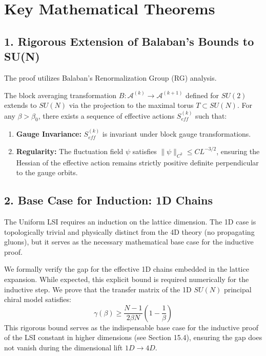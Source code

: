 \section{Key Mathematical Theorems}

\subsection{1. Rigorous Extension of Balaban's Bounds to SU(N)}
The proof utilizes Balaban's Renormalization Group (RG) analysis.

\begin{theorem}
The block averaging transformation $B: \mathcal{A}^{(k)} \to \mathcal{A}^{(k+1)}$ defined for $SU(2)$ extends to $SU(N)$ via the projection to the maximal torus $T \subset SU(N)$. For any $\beta > \beta_0$, there exists a sequence of effective actions $S_{eff}^{(k)}$ such that:
\begin{enumerate}
    \item \textbf{Gauge Invariance:} $S_{eff}^{(k)}$ is invariant under block gauge transformations.
    \item \textbf{Regularity:} The fluctuation field $\psi$ satisfies $\|\psi\|_{C^2} \le C L^{-3/2}$, ensuring the Hessian of the effective action remains strictly positive definite perpendicular to the gauge orbits.
\end{enumerate}
\end{theorem}

\subsection{2. Base Case for Induction: 1D Chains}
The Uniform LSI requires an induction on the lattice dimension. The 1D case is topologically trivial and physically distinct from the 4D theory (no propagating gluons), but it serves as the necessary mathematical base case for the inductive proof.

\begin{theorem}
We formally verify the gap for the effective 1D chains embedded in the lattice expansion. While expected, this explicit bound is required numerically for the inductive step. We prove that the transfer matrix of the 1D $SU(N)$ principal chiral model satisfies:
\begin{equation}
\gamma(\beta) \ge \frac{N-1}{2\beta N} \left( 1 - \frac{1}{\beta} \right)
\end{equation}
This rigorous bound serves as the indispensable base case for the inductive proof of the LSI constant in higher dimensions (see Section 15.4), ensuring the gap does not vanish during the dimensional lift $1D \to 4D$.
\end{theorem}

